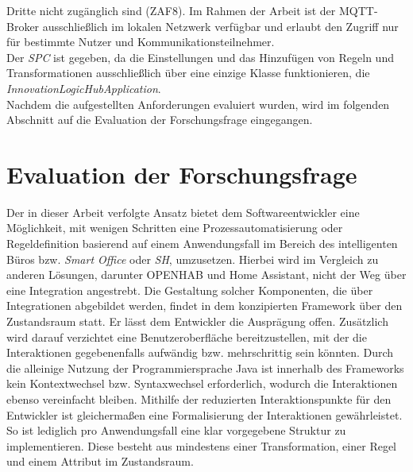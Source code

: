         Dritte nicht zugänglich sind (ZAF8). Im Rahmen der Arbeit ist der \acs{MQTT}-Broker ausschließlich im lokalen Netzwerk verfügbar und erlaubt den Zugriff nur für bestimmte Nutzer und Kommunikationsteilnehmer. 
        \\
        \linebreak
        Der \textit{\acl{SPC}} ist gegeben, da die Einstellungen und das Hinzufügen von Regeln und Transformationen ausschließlich über eine einzige Klasse funktionieren, die \textit{InnovationLogicHubApplication}. 
        \\
        \linebreak
        Nachdem die aufgestellten Anforderungen evaluiert wurden, wird im folgenden Abschnitt auf die Evaluation der Forschungsfrage eingegangen.
        \pagebreak

\section{Evaluation der Forschungsfrage}
    Der in dieser Arbeit verfolgte Ansatz bietet dem Softwareentwickler eine Möglichkeit, mit wenigen Schritten eine 
    Prozessautomatisierung oder Regeldefinition basierend auf einem Anwendungsfall im Bereich des intelligenten 
    Büros bzw. \textit{Smart Office} oder \textit{\acl{SH}}, umzusetzen. Hierbei wird im Vergleich zu anderen 
    Lösungen, darunter \acs{OPENHAB} und Home Assistant, nicht der Weg über eine Integration angestrebt. 
    Die Gestaltung solcher Komponenten, die über Integrationen abgebildet werden, findet in dem konzipierten 
    Framework über den Zustandsraum statt. Er lässt dem Entwickler die Ausprägung offen. Zusätzlich 
    wird darauf verzichtet eine Benutzeroberfläche bereitzustellen, mit der die Interaktionen gegebenenfalls 
    aufwändig bzw. mehrschrittig sein könnten. Durch die alleinige Nutzung der Programmiersprache Java ist innerhalb des 
    Frameworks kein Kontextwechsel bzw. Syntaxwechsel erforderlich, wodurch die Interaktionen ebenso vereinfacht bleiben. 
    Mithilfe der reduzierten Interaktionspunkte für den Entwickler ist gleichermaßen eine Formalisierung der Interaktionen 
    gewährleistet. So ist lediglich pro Anwendungsfall eine klar vorgegebene Struktur zu implementieren. Diese besteht aus mindestens einer 
    Transformation, einer Regel und einem Attribut im Zustandsraum. 
